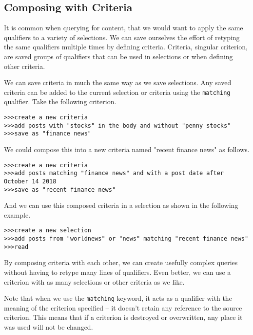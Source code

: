 \subsection{Composing with Criteria}
It is common when querying for content, that we would want to apply the same qualifiers to a
variety of selections. We can save ourselves the effort of retyping the same qualifiers multiple
times by defining criteria. Criteria, singular criterion, are saved groups of qualifiers that
can be used in selections or when defining other criteria.

We can save criteria in much the same way as we save selections. Any saved criteria can be
added to the current selection or criteria using the \texttt{matching} qualifier. Take the following criterion.
\newline\begin{minipage}{\linewidth}\begin{lstlisting}
>>>create a new criteria
>>>add posts with "stocks" in the body and without "penny stocks"
>>>save as "finance news"
\end{lstlisting}\end{minipage}
We could compose this into a new criteria named "recent finance news" as follows.
\newline\begin{minipage}{\linewidth}\begin{lstlisting}
>>>create a new criteria
>>>add posts matching "finance news" and with a post date after October 14 2018
>>>save as "recent finance news"
\end{lstlisting}\end{minipage}
And we can use this composed criteria in a selection as shown in the following example.
\newline\begin{minipage}{\linewidth}\begin{lstlisting}
>>>create a new selection
>>>add posts from "worldnews" or "news" matching "recent finance news"
>>>read
\end{lstlisting}\end{minipage}
By composing criteria with each other, we can create usefully complex queries without having
to retype many lines of qualifiers. Even better, we can use a criterion with as many selections or other criteria as we like.

Note that when we use the \texttt{matching} keyword, it acts as a qualifier with the meaning of the
criterion specified -- it doesn’t retain any reference to the source criterion. This means
that if a criterion is destroyed or overwritten, any place it was used will not be changed.

